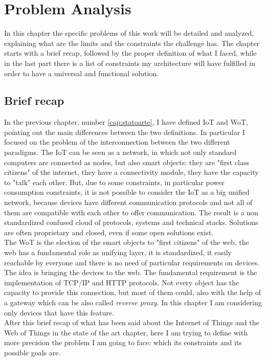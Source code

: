 %
%
\chapter{Problem Analysis}
%
\label{cap:probanalysis}
%
%

In this chapter the specific problems of this work will be detailed and analyzed, explaining what are the limits and the constraints the challenge has. The chapter starts with a brief recap, followed by the proper definition of what I faced, while in the last part there is a list of constraints my architecture will have fulfilled in order to have a universal and functional solution.
  

\section{Brief recap} \label{facedProblem}
In the previous chapter, number \ref{cap:statoarte}, I have defined IoT and WoT, pointing out the main differences between the two definitions. In particular I focused on the problem of the interconnection between the two different paradigms. 
The IoT can be seen as a network, in which not only standard computers are connected as nodes, but also smart objects: they are "first class citizens" of the internet, they have a connectivity module, they have the capacity to "talk" each other. But, due to some constraints, in particular power consumption constraints, it is not possible to consider the IoT as a big unified network, because devices have different communication protocols and not all of them are compatible with each other to offer communication. The result is a non standardized confused cloud of protocols, systems and technical stacks. Solutions are often proprietary and closed, even if some open solutions exist.\\
The WoT is the election of the smart objects to "first citizens" of the web, the web has a fundamental role as unifying layer, it is standardized, it easily reachable by everyone and there is no need of particular requirements on devices. The idea is bringing the devices to the web. The fundamental requirement is the implementation of TCP/IP and HTTP protocols. Not every object has the capacity to provide this connection, but most of them could, also with the help of a gateway which can be also called \textit{reverse proxy}. In this chapter I am considering only devices that have this feature.\\
After this brief recap of what has been said about the Internet of Things and the Web of Things in the state of the art chapter, here I am trying to define with more precision the problem I am going to face: which its constraints and its possible goals are.

